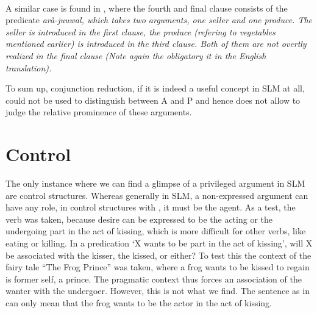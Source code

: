  \\
A similar case is found in , where the fourth and final clause consists of the predicate \em arà-juuwal, \em which takes two arguments, one seller and one produce. The seller  is introduced in the first clause, the produce (refering to vegetables mentioned earlier) is introduced in the third clause. Both of them are not overtly realized in the final clause (Note again the obligatory \em it \em in the English translation).



To sum up, conjunction reduction, if it is indeed a useful concept in SLM at all, could not be used to distinguish between A and P and hence does not allow to judge the relative prominence of these arguments.


\section{Control}\label{sec:grel:Control}
The only instance where we can find  a glimpse of a privileged argument in SLM are control structures. Whereas generally in SLM, a non-expressed argument can have any role, in control structures with , it must be the agent. As a test, the verb  was taken, because desire can be expressed to be the acting or the undergoing part in the act of kissing, which is more difficult for other verbs, like eating or killing. In a predication `X wants to be part in the act of kissing', will X be associated with the kisser, the kissed, or either? To test this the context of the fairy tale ``The Frog Prince'' was taken, where a frog wants to be kissed to regain is former self, a prince. The pragmatic context thus forces an association of the wanter with the undergoer. However, this is not what we find. The sentence as in  can only mean that the frog wants to be the actor in the act of kissing.


